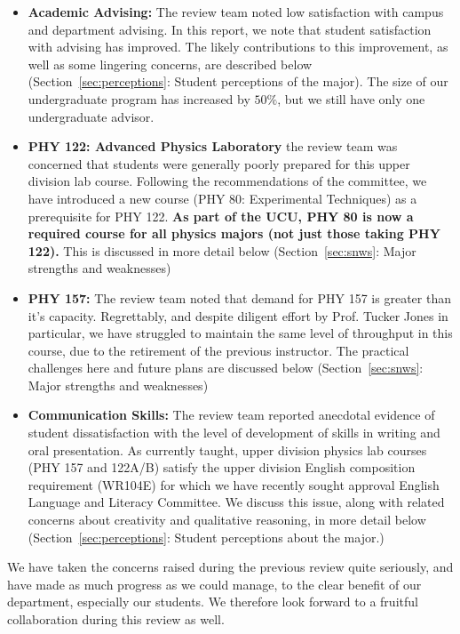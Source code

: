 \documentclass[12pt]{article}
\begin{document}
\begin{itemize}
 \item {\bf Academic Advising:} The review team noted low satisfaction
   with campus and department advising.  In this report, we note that
   student satisfaction with advising has improved.  The likely
   contributions to this improvement, as well as some lingering
   concerns, are described below (Section~\ref{sec:perceptions}:
   Student perceptions of the major).  The size of our undergraduate
   program has increased by $50\%$, but we still have only one
   undergraduate advisor.

 \item {\bf PHY 122: Advanced Physics Laboratory} the review team was
   concerned that students were generally poorly prepared for this
   upper division lab course.  Following the recommendations of the
   committee, we have introduced a new course (PHY 80: Experimental
   Techniques) as a prerequisite for PHY 122.  {\bf As part of the
     UCU, PHY 80 is now a required course for all physics majors (not
     just those taking PHY 122).}  This is discussed in more detail
   below (Section~\ref{sec:snws}: Major strengths and weaknesses)
  
 \item {\bf PHY 157:} The review team noted that demand for PHY 157 is
   greater than it's capacity.  Regrettably, and despite diligent
   effort by Prof. Tucker Jones in particular, we have struggled to
   maintain the same level of throughput in this course, due to the
   retirement of the previous instructor.  The practical challenges
   here and future plans are discussed below (Section~\ref{sec:snws}:
   Major strengths and weaknesses)

 \item {\bf Communication Skills:} The review team reported anecdotal
   evidence of student dissatisfaction with the level of development
   of skills in writing and oral presentation.  As currently taught,
   upper division physics lab courses (PHY 157 and 122A/B) satisfy the
   upper division English composition requirement (WR104E) for which
   we have recently sought approval English Language and Literacy
   Committee.  We discuss this issue, along with related concerns
   about creativity and qualitative reasoning, in more detail below
   (Section~\ref{sec:perceptions}: Student perceptions about the
   major.)
\end{itemize}
We have taken the concerns raised during the previous review quite
seriously, and have made as much progress as we could manage, to the
clear benefit of our department, especially our students.  We
therefore look forward to a fruitful collaboration during this review
as well.
\end{document}
